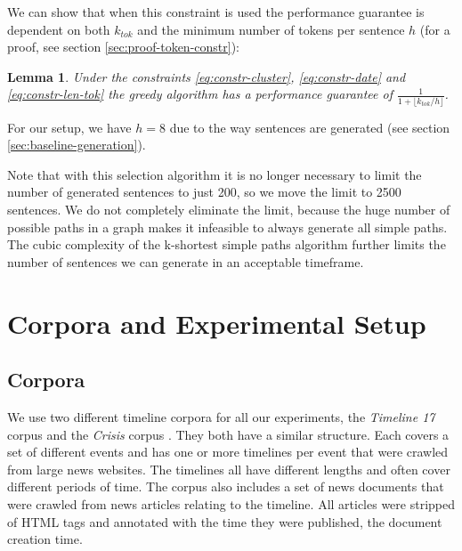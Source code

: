 \documentclass[a4paper,BCOR=10mm]{report}
\newtheorem{lemma}{Lemma}
\numberwithin{lemma}{chapter}
\numberwithin{definition}{chapter}
\begin{document}
We can show that when this constraint is used the performance guarantee is dependent on both $k_{tok}$ and the minimum number of tokens per sentence $h$ (for a proof, see section \ref{sec:proof-token-constr}):
\begin{lemma}
Under the constraints \ref{eq:constr-cluster}, \ref{eq:constr-date} and \ref{eq:constr-len-tok} the greedy algorithm has a performance guarantee of $\frac{1}{1 + \lfloor k_{\mathit{tok}} / h \rfloor}$.
\end{lemma}

For our setup, we have $h = 8$ due to the way sentences are generated (see section \ref{sec:baseline-generation}).





Note that with this selection algorithm it is no longer necessary to limit the number of generated sentences to just 200, so we move the limit to 2500 sentences.
We do not completely eliminate the limit, because the huge number of possible paths in a graph makes it infeasible to always generate all simple paths. The cubic complexity of the k-shortest simple paths algorithm further limits the number of sentences we can generate in an acceptable timeframe.

\chapter{Corpora and Experimental Setup} \label{sec:setup}

\section{Corpora} \label{sec:setup-corpora}

We use two different timeline corpora for all our experiments, the \textit{Timeline 17} corpus \citep{tran-tl17} and the \textit{Crisis} corpus \citep{tran-headlines}. They both have a similar structure. Each covers a set of different events and has one or more timelines per event that were crawled from large news websites. The timelines all have different lengths and often cover different periods of time. The corpus also includes a set of news documents that were crawled from news articles relating to the timeline. All articles were stripped of HTML tags and annotated with the time they were published, the document creation time.
\end{document}
